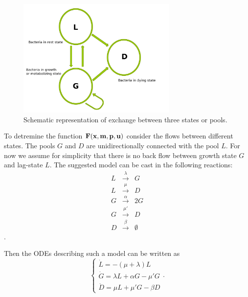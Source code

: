 \documentclass[10pt,A4paper]{article}
\begin{document}
\begin{figure}[t]
    \begin{center}
    \includegraphics[width=0.7\textwidth]{Figures/TPM_fig.pdf}
    \caption{Schematic representation of exchange between three states or pools.}
    \label{fig:SchematicRep}
    \end{center}
    \end{figure}

To detremine the function $\mathbf{F}(\mathbf{x}, \mathbf{m}, \mathbf{p}, \mathbf{u})$ consider the flows between different states.
The pools $G$ and $D$ are unidirectionally connected with the pool $L$. 
For now we assume for simplicity that there is no back flow between growth state $G$ and lag-state $L$. 
The suggested model can be cast in the following reactions:
\begin{eqnarray}
L &\stackrel{\lambda}{\longrightarrow} & G\\
L &\stackrel{\mu}{\longrightarrow} & D\\
G &\stackrel{\alpha}{\longrightarrow} & 2G\\
G &\stackrel{\mu'}{\longrightarrow} & D\\
D &\stackrel{\beta}{\longrightarrow} & \emptyset
\end{eqnarray}.

Then the ODEs describing such a model can be written as 
\begin{equation}
\begin{cases}
    \dot{L} = -(\mu + \lambda) L\\
    \dot{G} = \lambda L + \alpha G - \mu' G\\
    \dot{D} = \mu  L + \mu' G- \beta D  
\end{cases}.
\end{equation}

\end{document}
